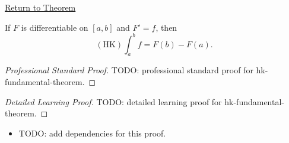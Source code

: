 \newpage
{}
\label{prf:hk-fundamental-theorem}
\begin{remark*}[Return]\hyperref[thm:hk-fundamental-theorem]{Return to Theorem}\end{remark*}

\begin{theorem*}
If \(F\) is differentiable on \([a,b]\) and \(F'=f\), then
\[
  (\mathrm{HK})\int_a^b f=F(b)-F(a).
\]
\end{theorem*}

\begin{proof}[Professional Standard Proof]
\LRAProofBodyStart
TODO: professional standard proof for hk-fundamental-theorem.
\end{proof}

\begin{proof}[Detailed Learning Proof]
\LRAProofBodyStart
TODO: detailed learning proof for hk-fundamental-theorem.
\end{proof}

\begin{remark*}
\end{remark*}

\begin{dependencies}
\begin{itemize}
  \item TODO: add dependencies for this proof.
\end{itemize}
\end{dependencies}

\clearpage
